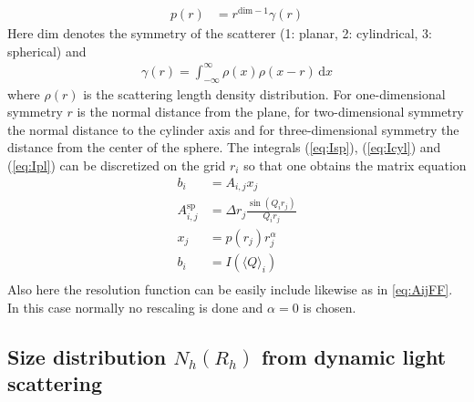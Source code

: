 \begin{align}
p(r) &= r^{\mathrm{dim}-1} \gamma(r)
\end{align}
Here $\mathrm{dim}$ denotes the symmetry of the scatterer (1: planar, 2: cylindrical, 3: spherical) and
\begin{align}
\gamma(r) = \int_{-\infty}^{\infty} \rho(x)\rho(x-r)\,\mathrm{d}x
\end{align}
where $\rho(r)$ is the scattering length density distribution. For one-dimensional symmetry $r$ is the normal distance from the plane, for two-dimensional symmetry the normal distance to the cylinder axis and for three-dimensional symmetry the distance from the center of the sphere.
The integrals (\ref{eq:Isp}), (\ref{eq:Icyl}) and (\ref{eq:Ipl}) can be discretized on the grid $r_i$ so that one obtains the matrix equation
\begin{align}
b_i &= A_{i,j} x_j \\
A_{i,j}^\mathrm{sp} &= \Delta r_j \frac{\sin(Q_i r_j)}{Q_i r_j}\\
x_j &= p(r_j) r_j^{\alpha}\\
b_i &= I(\langle Q\rangle_i) \\
\end{align}
Also here the resolution function can be easily include likewise as in \ref{eq:AijFF}. In this case normally no rescaling is done and $\alpha=0$ is chosen.

\subsection{Size distribution $N_h(R_h)$ from dynamic light scattering}~\\
\label{sec:DLS}

